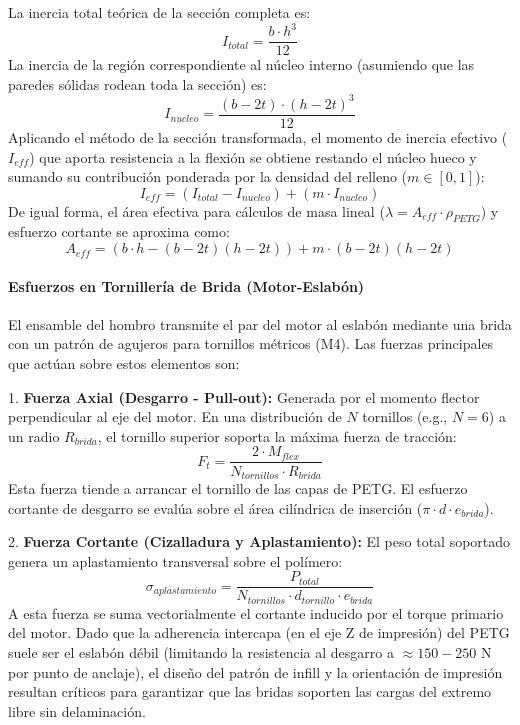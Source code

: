 \documentclass[12pt, a4paper]{article}
\begin{document}
La inercia total teórica de la sección completa es:
\begin{equation}
    I_{total} = \frac{b \cdot h^3}{12}
\end{equation}
La inercia de la región correspondiente al núcleo interno (asumiendo que las paredes sólidas rodean toda la sección) es:
\begin{equation}
    I_{nucleo} = \frac{(b - 2t) \cdot (h - 2t)^3}{12}
\end{equation}
Aplicando el método de la sección transformada, el momento de inercia efectivo ($I_{eff}$) que aporta resistencia a la flexión se obtiene restando el núcleo hueco y sumando su contribución ponderada por la densidad del relleno ($m \in [0, 1]$):
\begin{equation}
    I_{eff} = (I_{total} - I_{nucleo}) + (m \cdot I_{nucleo})
\end{equation}
De igual forma, el área efectiva para cálculos de masa lineal ($\lambda = A_{eff} \cdot \rho_{PETG}$) y esfuerzo cortante se aproxima como:
\begin{equation}
    A_{eff} = (b \cdot h - (b-2t)(h-2t)) + m \cdot (b-2t)(h-2t)
\end{equation}

\paragraph{Esfuerzos en Tornillería de Brida (Motor-Eslabón)}
El ensamble del hombro transmite el par del motor al eslabón mediante una brida con un patrón de agujeros para tornillos métricos (M4). Las fuerzas principales que actúan sobre estos elementos son:

1. \textbf{Fuerza Axial (Desgarro - Pull-out):} Generada por el momento flector perpendicular al eje del motor. En una distribución de $N$ tornillos (e.g., $N=6$) a un radio $R_{brida}$, el tornillo superior soporta la máxima fuerza de tracción:
\begin{equation}
    F_t = \frac{2 \cdot M_{flex}}{N_{tornillos} \cdot R_{brida}}
\end{equation}
Esta fuerza tiende a arrancar el tornillo de las capas de PETG. El esfuerzo cortante de desgarro se evalúa sobre el área cilíndrica de inserción ($\pi \cdot d \cdot e_{brida}$). 

2. \textbf{Fuerza Cortante (Cizalladura y Aplastamiento):} El peso total soportado genera un aplastamiento transversal sobre el polímero:
\begin{equation}
    \sigma_{aplastamiento} = \frac{P_{total}}{N_{tornillos} \cdot d_{tornillo} \cdot e_{brida}}
\end{equation}
A esta fuerza se suma vectorialmente el cortante inducido por el torque primario del motor. Dado que la adherencia intercapa (en el eje Z de impresión) del PETG suele ser el eslabón débil (limitando la resistencia al desgarro a $\approx 150-250$ N por punto de anclaje), el diseño del patrón de infill y la orientación de impresión resultan críticos para garantizar que las bridas soporten las cargas del extremo libre sin delaminación.
\end{document}
